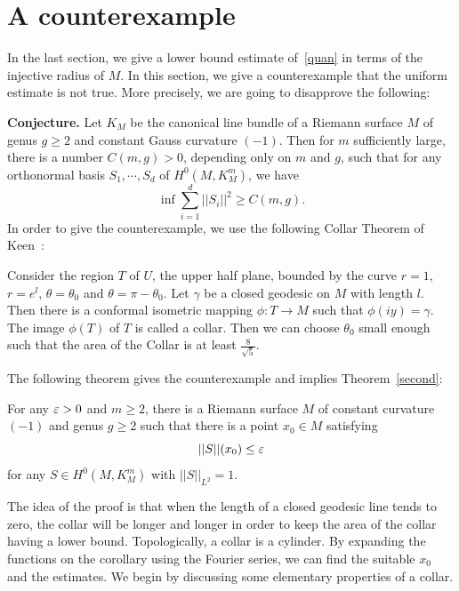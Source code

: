 \section{A counterexample}\label{sec3}

In the last section, we give a lower bound estimate of~\eqref{quan}
in terms of the injective radius of $M$.
In this section, we  give a counterexample that the 
uniform estimate is not true. More precisely, we are going to
disapprove the following:

{\bf Conjecture.} Let $K_M$ be the canonical line bundle of  a Riemann
surface $M$ of genus $g\geq 2$ and constant Gauss curvature $(-1)$. Then
for $m$ sufficiently large, there is a number $C(m,g)>0$,
depending only on $m$ and  $g$,
 such that for
any
orthonormal basis $S_1,\cdots,S_d$ of $H^0(M,K_M^m)$, we have
\[
\inf \sum_{i=1}^d||S_i||^2\geq C(m,g).
\]
In order to give the counterexample,
we use the following Collar Theorem of Keen~\cite[p264]{Keen}:

\begin{theorem}[Keen]\label{keen}
Consider the region $T$ of $U$, the upper half plane, bounded
by the curve $r=1$, $r=e^l$, $\theta=\theta_0$ and $\theta=\pi-\theta_0$.
Let
$\gamma$ be a closed geodesic on $M$ with length $l$. Then there is a
conformal
isometric mapping $\phi: T\rightarrow M$ such that $\phi(iy)=\gamma$.
The image $\phi(T)$ of $T$ is called a collar.
Then we can choose $\theta_0$ small enough such that
the area of the Collar is at least $\frac{8}{\sqrt 5}$.
\end{theorem}




The following theorem
gives the counterexample and implies Theorem~\ref{second}:




\begin{theorem}\label{counterexample} 
For any $\varepsilon>0$ and $m\geq 2$, there is a Riemann surface $M$ of
constant curvature $(-1)$ and genus $g\geq 2$ such that there is a point
$x_0\in M$ satisfying
\[
||S||(x_0)\leq\varepsilon
\]
for any $S\in H^0(M,K_M^m)$ with $||S||_{L^2}=1$.
\end{theorem}

The idea of the proof is that when the length of a closed geodesic 
line tends to zero, the collar will be longer and longer in order
to keep the area of the collar having a lower bound. Topologically,
a collar is a cylinder. By expanding the functions on the corollary using
the Fourier series, we can find the suitable $x_0$ and the estimates. 
We begin by discussing some elementary properties of a collar.




